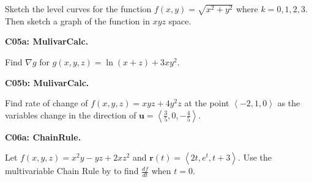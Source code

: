 \documentclass[12pt]{article}
\newcommand{\vect}{\mathbf}
\newcommand{\<}{\left\langle}
\renewcommand{\>}{\right\rangle}
\newcommand{\exerciseHeader}[4]{


  \vspace{0.5em}
  \textbf{#2}
  \vspace{0.5em}

}
\begin{document}
\begin{multicols}{2}
Sketch the level curves for the function \(f(x,y)=\sqrt{x^2+y^2}\)
where \(k=0,1,2,3\). Then sketch a graph of the function in \(xyz\) space.

%

%



\exerciseHeader{2017 June 19}{C05a: MulivarCalc.}{
Compute and apply the partial derivatives, gradient, and directional
derivatives of a multivariable real-valued function.
}{1/4}

Find \(\nabla g\) for \(g(x,y,z)=\ln(x+z)+3xy^2\).

%

\exerciseHeader{2017 June 21}{C05b: MulivarCalc.}{
Compute and apply the partial derivatives, gradient, and directional
derivatives of a multivariable real-valued function.
}{3/4}

Find rate of change of \(f(x,y,z)=xyz+4y^2z\) at the point
\(\<-2,1,0\>\) as the variables change in the direction of
\(\vect u =\<\frac{3}{5},0,-\frac{4}{5}\>\).

%



\exerciseHeader{2017 June 21}{C06a: ChainRule.}{
Apply the multivariable Chain Rule to compute derivatives and find normal
vectors.
}{1/4}

Let \(f(x,y,z)=x^2y-yz+2xz^2\) and \(\vect{r}(t)=\<2t,e^t,t+3\>\).
Use the multivariable Chain Rule by to find
\(\frac{df}{dt}\) when \(t=0\).
%


\end{multicols}
\end{document}
